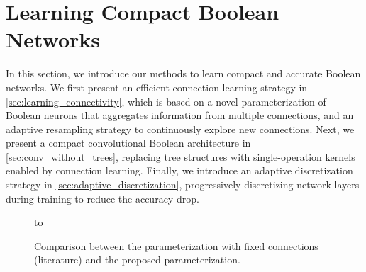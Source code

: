 \section{Learning Compact Boolean Networks} \label{sec:method}

In this section, we introduce our  methods to learn compact and accurate Boolean networks. 
We first present an efficient connection learning strategy in \cref{sec:learning_connectivity}, which is based on a novel parameterization of Boolean neurons
 that aggregates information from multiple connections, and an adaptive resampling strategy to continuously explore new connections.
Next, we present a compact convolutional Boolean architecture in \cref{sec:conv_without_trees}, replacing tree structures with single-operation
 kernels enabled by connection learning.
Finally, we introduce an adaptive discretization strategy in \cref{sec:adaptive_discretization}, progressively discretizing network layers during training to
reduce the accuracy drop.
\begin{figure}[t]
\noindent\hbox to 
\caption{Comparison between the parameterization with fixed connections (literature) and the proposed parameterization.}
\label{fig:conn-all}
\end{figure}


